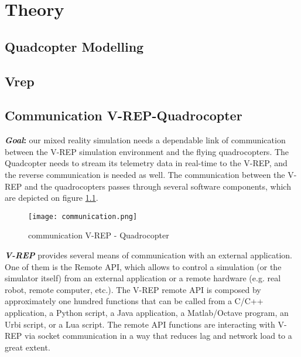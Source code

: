 \chapter{Theory}
\label{sec:theo}


\section{Quadcopter Modelling}





\section{Vrep}





\section{Communication V-REP-Quadrocopter}
\textbf{\textit{Goal}:} our mixed reality simulation needs a dependable link of communication between the V-REP simulation environment and the flying quadrocopters. The Quadcopter needs to stream its telemetry data in real-time to the V-REP, and the reverse communication is needed as well.
The communication between the V-REP and the quadrocopters passes through several software components, which are depicted on figure \ref{fig:communication}. 

\begin{figure}[h!]
 \begin{center}
  \texttt{[image: communication.png]}
 \end{center}
  \caption{communication V-REP - Quadrocopter\label{fig:communication}}
\end{figure}

\textbf{\textit{V-REP}} provides several means of communication with an external application. One of them is the Remote API, which allows to control a simulation (or the simulator itself) from an external application or a remote hardware (e.g. real robot, remote computer, etc.). The V-REP remote API is composed by approximately one hundred functions that can be called from a C/C++ application, a Python script, a Java application, a Matlab/Octave program, an Urbi script, or a Lua script. The remote API functions are interacting with V-REP via socket communication in a way that reduces lag and network load to a great extent.


